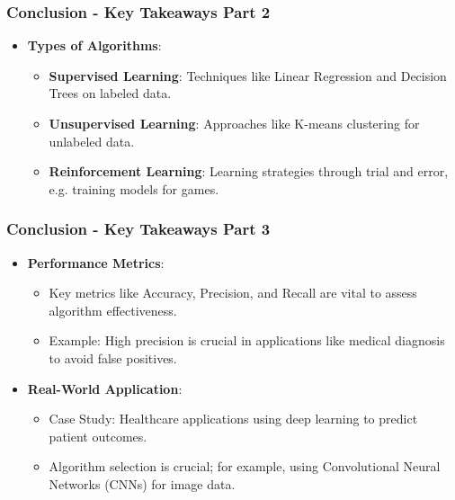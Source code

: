 \documentclass[aspectratio=169]{beamer}
\begin{document}
\begin{frame}[fragile]
    \frametitle{Conclusion - Key Takeaways Part 2}
    \begin{itemize}
        \item \textbf{Types of Algorithms}:
        \begin{itemize}
            \item \textbf{Supervised Learning}: Techniques like Linear Regression and Decision Trees on labeled data.
            \item \textbf{Unsupervised Learning}: Approaches like K-means clustering for unlabeled data.
            \item \textbf{Reinforcement Learning}: Learning strategies through trial and error, e.g. training models for games.
        \end{itemize}
    \end{itemize}
\end{frame}

\begin{frame}[fragile]
    \frametitle{Conclusion - Key Takeaways Part 3}
    \begin{itemize}
        \item \textbf{Performance Metrics}:
        \begin{itemize}
            \item Key metrics like Accuracy, Precision, and Recall are vital to assess algorithm effectiveness.
            \item Example: High precision is crucial in applications like medical diagnosis to avoid false positives.
        \end{itemize}
        \item \textbf{Real-World Application}:
        \begin{itemize}
            \item Case Study: Healthcare applications using deep learning to predict patient outcomes.
            \item Algorithm selection is crucial; for example, using Convolutional Neural Networks (CNNs) for image data.
        \end{itemize}
    \end{itemize}
\end{frame}
\end{document}
